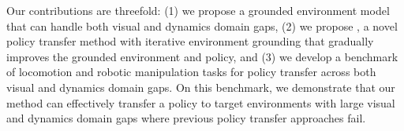 Our contributions are threefold: (1) we propose a grounded environment model that can handle both visual and dynamics domain gaps, (2) we propose \method, a novel policy transfer method with iterative environment grounding that gradually improves the grounded environment and policy, and (3) we develop a benchmark of locomotion and robotic manipulation tasks for policy transfer across both visual and dynamics domain gaps. On this benchmark, we demonstrate that our method can effectively transfer a policy to target environments with large visual and dynamics domain gaps where previous policy transfer approaches fail. 